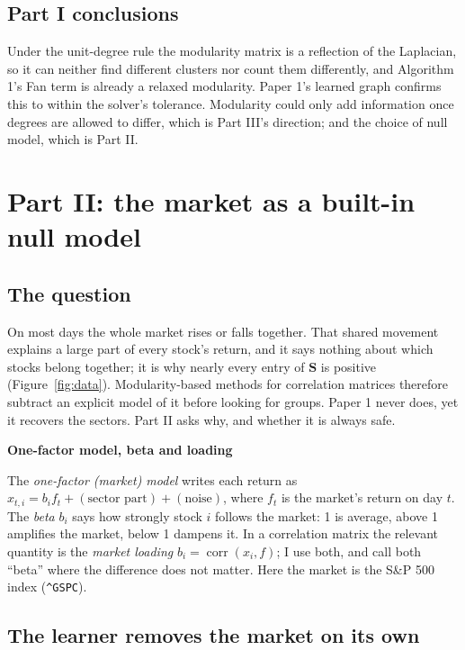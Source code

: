 \documentclass[11pt,a4paper]{article}
\newcommand{\Smat}{\mathbf{S}}
\theoremstyle{remark}
\newenvironment{defn}[1]
 {\par\vspace{2mm}\begin{lrbox}{\defnbox}%
  \begin{minipage}{\dimexpr\textwidth-16pt\relax}\small\textcolor{BlueLink}{\textbf{#1}}\par\vspace{0.6mm}}
 {\end{minipage}\end{lrbox}%
  \noindent\setlength{\fboxsep}{6pt}\setlength{\fboxrule}{.4pt}%
  \fcolorbox{BlueLink!40}{PanelBlue}{\usebox{\defnbox}}\par\vspace{2mm}}
\begin{document}
\subsection{Part I conclusions}

Under the unit-degree rule the modularity matrix is a reflection of the Laplacian, so it
can neither find different clusters nor count them differently, and Algorithm 1's Fan
term is already a relaxed modularity. Paper 1's learned graph confirms this to within
the solver's tolerance. Modularity could only add information once degrees are allowed
to differ, which is Part III's direction; and the choice of null model, which is
Part II.

\section{Part II: the market as a built-in null model}\label{sec:part2}

\subsection{The question}

On most days the whole market rises or falls together. That shared movement explains a
large part of every stock's return, and it says nothing about which stocks belong
together; it is why nearly every entry of $\Smat$ is positive
(Figure~\ref{fig:data}). Modularity-based methods for correlation matrices therefore
subtract an explicit model of it before looking for groups. Paper 1 never does, yet it
recovers the sectors. Part II asks why, and whether it is always safe.

\begin{defn}{One-factor model, beta and loading}
The \emph{one-factor (market) model} writes each return as
$x_{t,i}=b_if_t+(\text{sector part})+(\text{noise})$, where $f_t$ is the market's return
on day $t$. The \emph{beta} $b_i$ says how strongly stock $i$ follows the market: 1 is
average, above 1 amplifies the market, below 1 dampens it. In a correlation matrix the
relevant quantity is the \emph{market loading} $b_i=\operatorname{corr}(x_i,f)$; I use
both, and call both ``beta'' where the difference does not matter. Here the market is
the S\&P 500 index (\texttt{\^{}GSPC}).
\end{defn}

\subsection{The learner removes the market on its own}\label{sec:implicit}
\end{document}
